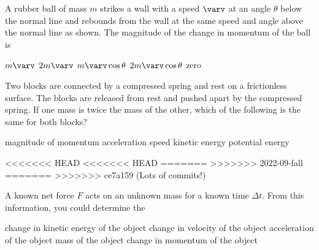\documentclass{../../oss-apphys-exam}
\begin{document}
\begin{multicols*}{2}
\begin{questions}
    \question A rubber ball of mass $m$ strikes a wall with a speed $\varv$ at
    an angle $\theta$ below the normal line and rebounds from the wall at the
    same speed and angle above the normal line as shown. The magnitude of the
    change in momentum of the ball is
    \begin{center}
    \end{center}
    \begin{choices}
      \choice $m\varv$
      \choice $2m\varv$
      \choice $m\varv\cos\theta$
      \choice $2m\varv\cos\theta$
      \choice  zero
    \end{choices}
    
    \question Two blocks are connected by a compressed spring and rest on a
    frictionless surface. The blocks are released from rest and pushed apart
    by the compressed spring. If one mass is twice the mass of the other,
    which of the following is the same for both blocks?
    \begin{choices}
      \choice magnitude of momentum
      \choice acceleration
      \choice speed
      \choice kinetic energy
      \choice potential energy
    \end{choices}
<<<<<<< HEAD
<<<<<<< HEAD
=======
    \vspace{.7in}
>>>>>>> 2022-09-fall
=======
    \vspace{.7in}
>>>>>>> ce7a159 (Lots of commits!)
    
    \question A known net force $F$ acts on an unknown mass for a known time
    $\Delta t$. From this information, you could determine the
    \begin{choices}
      \choice change in kinetic energy of the object
      \choice change in velocity of the object
      \choice acceleration of the object
      \choice mass of the object
      \choice change in momentum of the object
    \end{choices}
    \columnbreak
    

\end{questions}
\end{multicols*}
\end{document}
